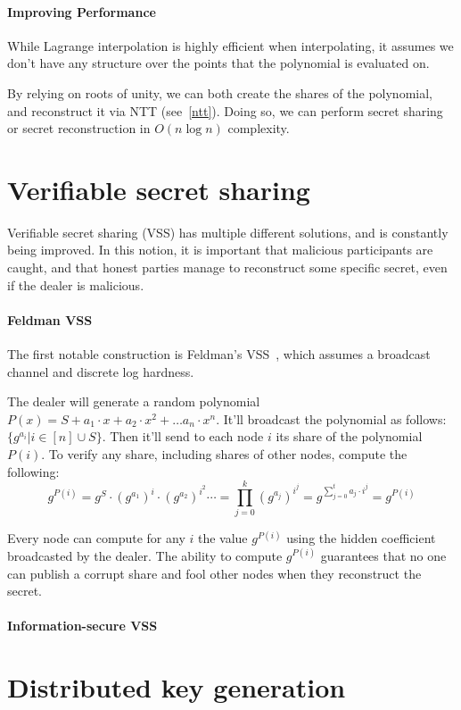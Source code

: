 \paragraph{Improving Performance}
While Lagrange interpolation is highly efficient when interpolating, it assumes we don't have 
any structure over the points that the polynomial is evaluated on.

By relying on roots of unity, we can both create the shares of the polynomial, and reconstruct it 
via NTT (see~\ref{ntt}). 
Doing so, we can perform secret sharing or secret reconstruction in $O(n\log n)$ complexity.

\section{Verifiable secret sharing}
Verifiable secret sharing (VSS) has multiple different solutions, and is constantly being improved. 
In this notion, it is important that malicious participants are caught, and that honest parties manage to reconstruct some specific secret, even if the dealer is malicious. 

\paragraph{Feldman VSS}
The first notable construction is Feldman's VSS~\cite{feldman-vss}, which assumes a broadcast channel and discrete log hardness.

The dealer will generate a random polynomial $P(x)=S+a_1\cdot x +a_2\cdot x^2 +\dots a_n\cdot x^n$. 
It'll broadcast the polynomial as follows: $\{g^{a_i} | i\in [n]\cup {S}\}$.
Then it'll send to each node $i$ its share of the polynomial $P(i)$. 
To verify any share, including shares of other nodes, compute the following: 
$$ g^{P(i)} =
 g^{S}\cdot (g^{a_1})^{i} \cdot (g^{a_2})^{i^2}\cdots  =
 \prod_{j=0}^{k} (g^{a_j})^{i^j} = 
 g^{\sum_{j=0}^{t} a_j \cdot i^j} = 
 g^{P(i)} $$

Every node can compute for any $i$ the value $g^{P(i)}$ using the hidden coefficient broadcasted by the dealer.  
The ability to compute $g^{P(i)}$ guarantees that no one can publish a corrupt share and fool other nodes when they reconstruct the secret.

\paragraph{Information-secure VSS}
\section{Distributed key generation}
